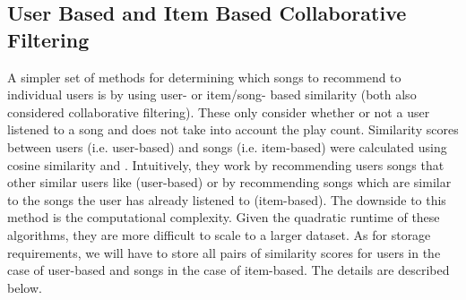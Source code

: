 \documentclass[12pt,preprint]{aastex}
\begin{document}
%


\subsection{User Based and Item Based Collaborative Filtering}
A simpler set of methods for determining which songs to recommend to individual users is by using user- or item/song- based similarity (both also considered collaborative filtering). These only consider whether or not a user listened to a song and does not take into account the play count. Similarity scores between users (i.e. user-based) and songs (i.e. item-based) were calculated using cosine similarity \citep{aiolli2013preliminary} and \citep{li2012million}. Intuitively, they work by recommending users songs that other similar users like (user-based) or by recommending songs which are similar to the songs the user has already listened to (item-based). The downside to this method is the computational complexity. Given the quadratic runtime of these algorithms, they are more difficult to scale to a larger dataset. As for storage requirements, we will have to store all pairs of similarity scores for users in the case of user-based and songs in the case of item-based. The details are described below.
\end{document}
